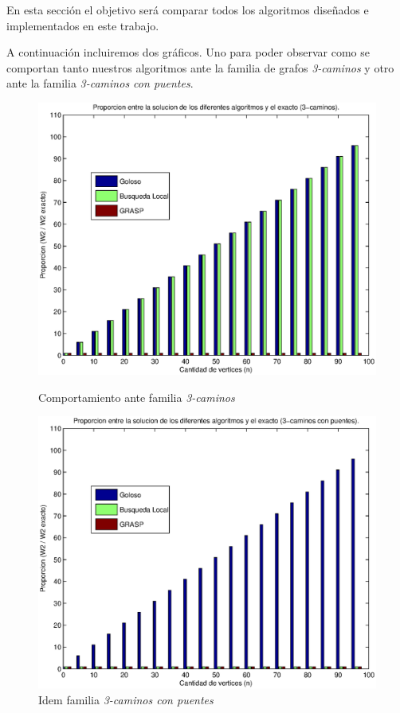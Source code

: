 En esta sección el objetivo será comparar todos los algoritmos diseñados e implementados en este trabajo.

A continuación incluiremos dos gráficos. Uno para poder observar como se comportan tanto nuestros algoritmos ante la familia de grafos \emph{3-caminos} y otro ante la familia \emph{3-caminos con puentes}.

\begin{figure}[H]
    \begin{minipage}{0.5\linewidth}
      \includegraphics[width=\linewidth]{graficos/todos_proporcion_3caminos.eps}
      \caption{Comportamiento ante familia \emph{3-caminos}}\label{fig:comportamiento-familia-rompe}
    \end{minipage}
    \hfill
    \begin{minipage}{0.5\linewidth}
      \includegraphics[width=\linewidth]{graficos/todos_proporcion_puentes.eps}
      \caption{Idem familia \emph{3-caminos con puentes}}\label{fig:comportamiento-familia-puente}
    \end{minipage}    
\end{figure}

